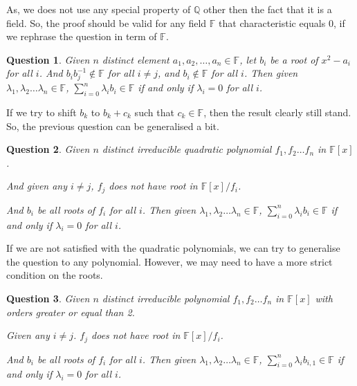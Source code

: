 \documentclass{article}
\newtheorem{question}{Question}[section]
\begin{document}
    As, we does not use any special property of $ \mathbb{Q} $
    other then the fact that it is a field.
    So, the proof should be valid for any field $ \mathbb{F} $ that characteristic equals 0,
    if we rephrase the question in term of $ \mathbb{F} $.

    \begin{question}
        Given $ n $ distinct element $ a_{1}, a_{2}, \dots, a_{n} \in \mathbb{F} $,
        let $ b_{i} $ be a root of $ x^{2} - a_{i} $ for all $ i $.
        And $ b_{i}b_{j}^{-1} \notin \mathbb{F} $ for all $ i \neq j $,
        and $ b_{i} \notin \mathbb{F} $ for all $ i $.
        Then given $ \lambda_{1}, \lambda_{2} \dots \lambda_{n} \in \mathbb{F} $,
        $ \sum_{i=0}^{n} \lambda_{i}b_{i} \in \mathbb{F} $
        if and only if $ \lambda_{i} = 0 $ for all $ i $.
    \end{question}

    If we try to shift $ b_{k} $ to $ b_{k} + c_{k} $
    such that $ c_{k} \in \mathbb{F} $,
    then the result clearly still stand.
    So, the previous question can be generalised a bit.

    \begin{question}
        Given $ n $ distinct irreducible quadratic polynomial
        $ f_{1}, f_{2} \dots f_{n} $ in $ \mathbb{F}[x] $.

        And given any $ i \neq j $, $ f_{j} $ does not have root in $ \mathbb{F}[x]/f_{i} $.

        And $ b_{i} $ be all roots of $ f_{i} $ for all $i$.
        Then given $ \lambda_{1}, \lambda_{2} \dots \lambda_{n} \in \mathbb{F} $,
        $ \sum_{i=0}^{n} \lambda_{i}b_{i} \in \mathbb{F} $
        if and only if $ \lambda_{i} = 0 $ for all $ i $.
    \end{question}

    If we are not satisfied with the quadratic polynomials,
    we can try to generalise the question to any polynomial.
    However, we may need to have a more strict condition on the roots.

    \begin{question}
        Given $ n $ distinct irreducible polynomial
        $ f_{1}, f_{2} \dots f_{n} $ in $ \mathbb{F}[x] $
        with orders greater or equal than 2.

        Given any $ i \neq j$. $ f_{j} $ does not have root in $ \mathbb{F}[x]/f_{i} $.
        
        And $ b_{i} $ be all roots of $ f_{i} $ for all $i$.
        Then given $ \lambda_{1}, \lambda_{2} \dots \lambda_{n} \in \mathbb{F} $,
        $ \sum_{i=0}^{n} \lambda_{i}b_{i,1} \in \mathbb{F} $
        if and only if $ \lambda_{i} = 0 $ for all $ i $.
    \end{question}
\end{document}
